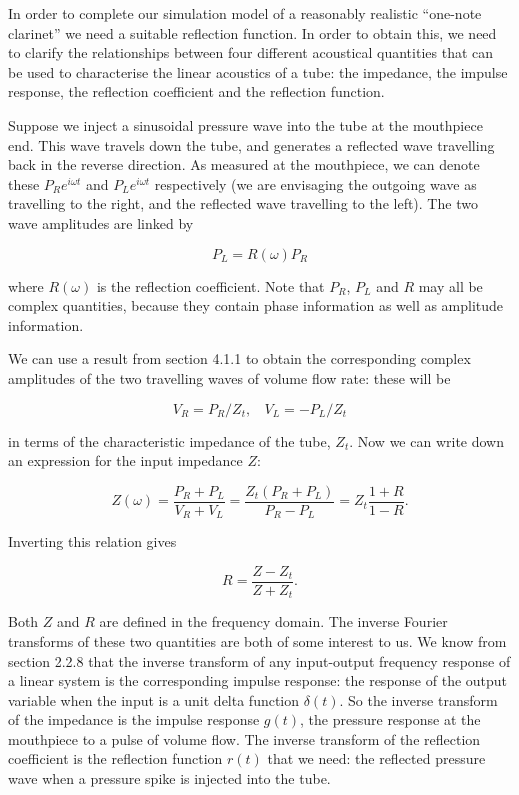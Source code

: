   In order to complete our simulation model of a reasonably realistic 
  ``one-note clarinet'' we need a suitable reflection function. In order to 
  obtain this, we need to clarify the relationships between four different 
  acoustical quantities that can be used to characterise the linear acoustics 
  of a tube: the impedance, the impulse response, the reflection coefficient 
  and the reflection function. 

  Suppose we inject a sinusoidal pressure wave into the tube at the mouthpiece 
  end. This wave travels down the tube, and generates a reflected wave 
  travelling back in the reverse direction. As measured at the mouthpiece, we 
  can denote these $P_R e^{i \omega t}$ and $P_L e^{i \omega t}$ respectively 
  (we are envisaging the outgoing wave as travelling to the right, and the 
  reflected wave travelling to the left). The two wave amplitudes are linked by 

  $$P_L=R(\omega) P_R \tag{1}$$ 

  where $R(\omega)$ is the reflection coefficient. Note that $P_R$, $P_L$ and 
  $R$ may all be complex quantities, because they contain phase information as 
  well as amplitude information. 

  We can use a result from section 4.1.1 to obtain the corresponding complex 
  amplitudes of the two travelling waves of volume flow rate: these will be 

  $$V_R=P_R/Z_t,\mathrm{~~~~}V_L=-P_L/Z_t \tag{2}$$ 

  in terms of the characteristic impedance of the tube, $Z_t$. Now we can write 
  down an expression for the input impedance $Z$: 

  $$Z(\omega) = \dfrac{P_R+P_L}{V_R+V_L}=\dfrac{Z_t(P_R+P_L)}{P_R-P_L}=Z_t 
  \dfrac{1+R}{1-R}. \tag{3}$$ 

  Inverting this relation gives 

  $$R=\dfrac{Z-Z_t}{Z+Z_t}. \tag{4}$$ 

  Both $Z$ and $R$ are defined in the frequency domain. The inverse Fourier 
  transforms of these two quantities are both of some interest to us. We know 
  from section 2.2.8 that the inverse transform of any input-output frequency 
  response of a linear system is the corresponding impulse response: the 
  response of the output variable when the input is a unit delta function 
  $\delta(t)$. So the inverse transform of the impedance is the impulse 
  response $g(t)$, the pressure response at the mouthpiece to a pulse of volume 
  flow. The inverse transform of the reflection coefficient is the reflection 
  function $r(t)$ that we need: the reflected pressure wave when a pressure 
  spike is injected into the tube. 

